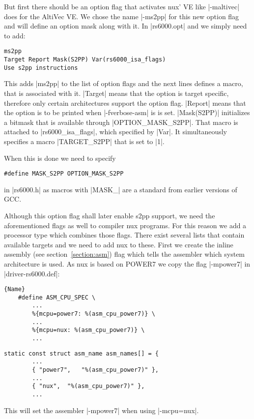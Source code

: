 But first there should be an option flag that activates nux' VE like |-maltivec| does for the AltiVec VE.
We chose the name |-ms2pp| for this new option flag and will define an option mask along with it.
In |rs6000.opt| and we simply need to add:
\begin{lstlisting}
ms2pp
Target Report Mask(S2PP) Var(rs6000_isa_flags)
Use s2pp instructions
\end{lstlisting}
This adds |ms2pp| to the list of option flags and the next lines defines a macro, that is associated with it.
|Target| means that the option is target specific, therefore only certain architectures support the option flag.
|Report| means that the option is to be printed when |-fverbose-asm| is is set.
|Mask(S2PP)| initializes a bitmask that is available through |OPTION_MASK_S2PP|.
That macro is attached to |rs6000_isa_flags|, which specified by |Var|.
It simultaneously specifies a macro |TARGET_S2PP| that is set to |1|. \citep{GCCint:options}

When this is done we need to specify 
\begin{lstlisting}
#define MASK_S2PP OPTION_MASK_S2PP
\end{lstlisting}
in |rs6000.h| as macros with |MASK_| are a standard from earlier versions of GCC.

Although this option flag shall later enable s2pp support, we need the aforementioned flags as well to compiler nux programs.
For this reason we add a processor type which combines those flags.
There exist several lists that contain available targets and we need to add nux to these.
First we create the inline assembly (see section~\ref{section:asm}) flag which tells the assembler which system architecture is used.
As nux is based on POWER7 we copy the flag |-mpower7| in |driver-rs6000.def|:

    \begin{lstlisting}[caption=rs6000.h]{Name}
    #define ASM_CPU_SPEC \
        ...
        %{mcpu=power7: %(asm_cpu_power7)} \
        ...
        %{mcpu=nux: %(asm_cpu_power7)} \
        ...
    \end{lstlisting}
    \begin{lstlisting}[caption=driver-rs6000.c]
    static const struct asm_name asm_names[] = {
        ...
        { "power7",   "%(asm_cpu_power7)" },
        ...
        { "nux",  "%(asm_cpu_power7)" },
        ...
    \end{lstlisting}

This will set the assembler |-mpower7| when using |-mcpu=nux|.

